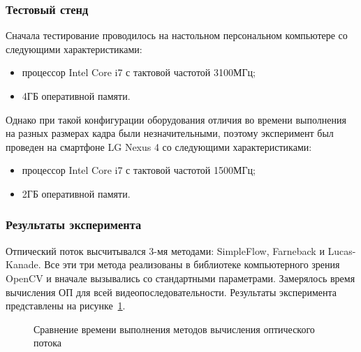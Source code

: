 \subsubsection{Тестовый стенд}
Сначала тестирование проводилось на настольном персональном компьютере со следующими характеристиками:

\begin{itemize}
\item процессор Intel Core i7 с тактовой частотой 3100МГц; 
\item 4ГБ оперативной памяти.
\end{itemize}

Однако при такой конфигурации оборудования отличия во времени выполнения на разных размерах кадра были незначительными, поэтому эксперимент был проведен на смартфоне LG Nexus 4 со следующими характеристиками:
\begin{itemize}
\item процессор Intel Core i7 с тактовой частотой 1500МГц;
\item 2ГБ оперативной памяти.
\end{itemize}

\subsubsection{Результаты эксперимента}
Отпический поток высчитывался 3-мя методами: SimpleFlow, Farneback и Lucas-Kanade. Все эти три метода реализованы в библиотеке компьютерного зрения OpenCV и вначале вызывались со стандартными параметрами. Замерялось время вычисления ОП для всей видеопоследовательности. Результаты эксперимента представлены на рисунке~\ref{pic:compareMethods}.

\begin{figure}[!htb]
\caption{Сравнение времени выполнения методов вычисления оптического потока}
\label{pic:compareMethods}
\end{figure}


